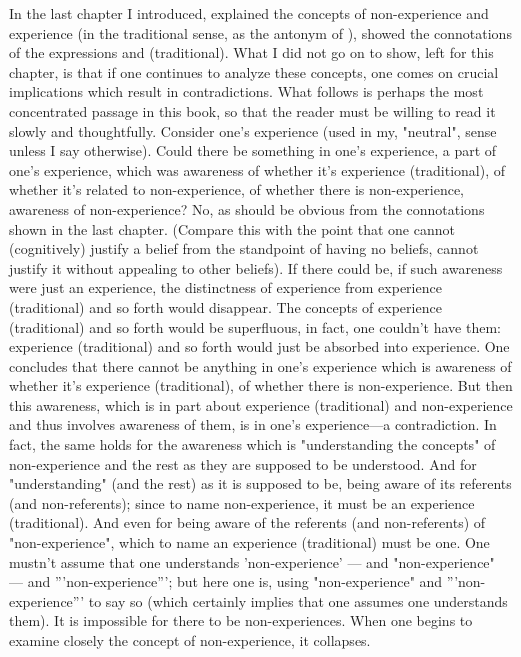 \documentclass[10pt,twoside,draft]{memoir}
\newcommand{\triquote}[1]{'''#1'''}
\begin{document}
{In the last chapter I introduced, explained the concepts of 
non-experience and experience (in the traditional sense, as the antonym of 
), showed the connotations of the expressions 
 and  (traditional). What I did not go on to 
show, left for this chapter, is that if one continues to analyze these concepts, 
one comes on crucial implications which result in contradictions. What 
follows is perhaps the most concentrated passage in this book, so that the 
reader must be willing to read it slowly and thoughtfully. Consider one's 
experience (used in my, "neutral", sense unless I say otherwise). Could there 
be something in one's experience, a part of one's experience, which was 
awareness of whether it's experience (traditional), of whether it's related to 
non-experience, of whether there is non-experience, awareness of 
non-experience? No, as should be obvious from the connotations shown in 
the last chapter. (Compare this with the point that one cannot (cognitively) 
justify a belief from the standpoint of having no beliefs, cannot justify it 
without appealing to other beliefs). If there could be, if such awareness were 
just an experience, the distinctness of experience from experience 
(traditional) and so forth would disappear. The concepts of experience 
(traditional) and so forth would be superfluous, in fact, one couldn't have 
them: experience (traditional) and so forth would just be absorbed into 
experience. One concludes that there cannot be anything in one's experience 
which is awareness of whether it's experience (traditional), of whether there 
is non-experience. But then this awareness, which is in part about experience 
(traditional) and non-experience and thus involves awareness of them, is in 
one's experience---a contradiction. In fact, the same holds for the awareness 
which is "understanding the concepts" of non-experience and the rest as 
they are supposed to be understood. And for "understanding"
 (and the rest) as it is supposed to be, being aware of its 
referents (and non-referents); since to name non-experience, it must be an 
experience (traditional). And even for being aware of the referents (and 
non-referents) of "non-experience", which to name an experience 
(traditional) must be one. One mustn't assume that one understands 
'non-experience' --- and "non-experience" --- and \triquote{non-experience}; but here 
one is, using "non-experience" and \triquote{non-experience} to say so (which 
certainly implies that one assumes one understands them). It is impossible 
for there to be non-experiences. When one begins to examine closely the 
concept of non-experience, it collapses. 

}
\end{document}
